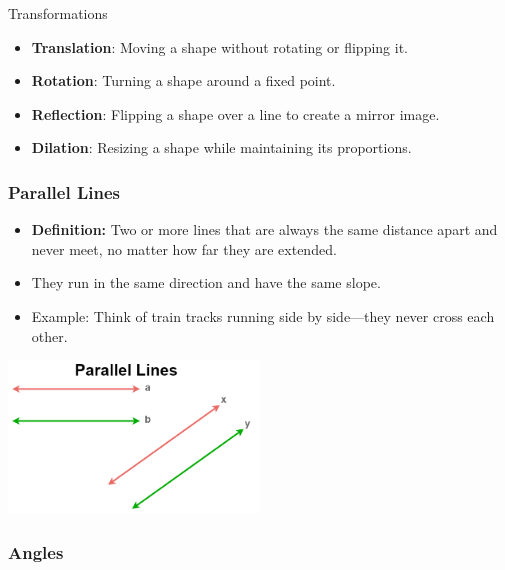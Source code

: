 \documentclass{beamer}
\begin{document}
\begin{frame}{Transformations}
    \begin{itemize}
        \item \textbf{Translation}: Moving a shape without rotating or flipping it.
        \item \textbf{Rotation}: Turning a shape around a fixed point.
        \item \textbf{Reflection}: Flipping a shape over a line to create a mirror image.
        \item \textbf{Dilation}: Resizing a shape while maintaining its proportions.
    \end{itemize}
\end{frame}

\begin{frame}
    \frametitle{Parallel Lines}
    
    \begin{itemize}
        \item \textbf{Definition:} Two or more lines that are always the same distance apart and never meet, no matter how far they are extended.
        \item They run in the same direction and have the same slope.
        \item Example: Think of train tracks running side by side—they never cross each other.
    \end{itemize}
    
    \begin{center}
        \includegraphics[width=0.5\textwidth]{Parallellines.png} %
    \end{center}

\end{frame}
\begin{frame}
    \frametitle{Angles}
\end{frame}
\end{document}
